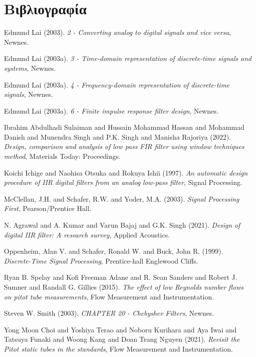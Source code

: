 \documentclass[breaklines=true, 12pt]{article}
\begin{document}
\section{Βιβλιογραφία}
\label{sec:orge394ee6}

\noindent
Edmund Lai (2003). \emph{2 - Converting analog to digital signals and vice versa}, Newnes.

\noindent
Edmund Lai (2003a). \emph{3 - Time-domain representation of discrete-time signals and systems}, Newnes.

\noindent
Edmund Lai (2003a). \emph{4 - Frequency-domain representation of discrete-time signals}, Newnes.

\noindent
Edmund Lai (2003a). \emph{6 - Finite impulse response filter design}, Newnes.

\noindent
Ibrahim Abdulhadi Sulaiman and Hussain Mohammad Hassan and Mohammad Danish and Munendra Singh and P.K. Singh and Manisha Rajoriya (2022). \emph{Design, comparison and analysis of low pass FIR filter using window techniques method}, Materials Today: Proceedings.

\noindent
Koichi Ichige and Naohisa Otsuka and Rokuya Ishii (1997). \emph{An automatic design procedure of IIR digital filters from an analog low-pass filter}, Signal Processing.

\noindent
McClellan, J.H. and Schafer, R.W. and Yoder, M.A. (2003). \emph{Signal Processing First}, Pearson/Prentice Hall.

\noindent
N. Agrawal and A. Kumar and Varun Bajaj and G.K. Singh (2021). \emph{Design of digital IIR filter: A research survey}, Applied Acoustics.

\noindent
Oppenheim, Alan V. and Schafer, Ronald W. and Buck, John R. (1999). \emph{Discrete-Time Signal Processing}, Prentice-hall Englewood Cliffs.

\noindent
Ryan B. Spelay and Kofi Freeman Adane and R. Sean Sanders and Robert J. Sumner and Randall G. Gillies (2015). \emph{The effect of low Reynolds number flows on pitot tube measurements}, Flow Measurement and Instrumentation.

\noindent
Steven W. Smith (2003). \emph{CHAPTER 20 - Chebyshev Filters}, Newnes.

\noindent
Yong Moon Choi and Yoshiya Terao and Noboru Kurihara and Aya Iwai and Tatsuya Funaki and Woong Kang and Doan Trang Nguyen (2021). \emph{Revisit the Pitot static tubes in the standards}, Flow Measurement and Instrumentation.
\end{document}
